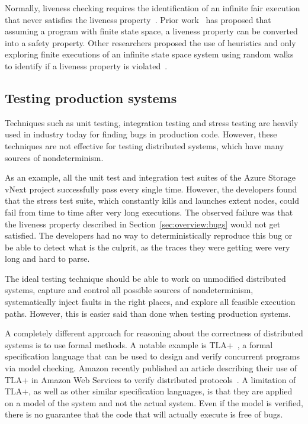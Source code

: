 Normally, liveness checking requires the identification of an infinite fair execution that never satisfies the liveness property~\cite{schuppan2004efficient, musuvathi2008fair}. Prior work~\cite{schuppan2004efficient} has proposed that assuming a program with finite state space, a liveness property can be converted into a safety property. Other researchers proposed the use of heuristics and only exploring finite executions of an infinite state space system using random walks to identify if a liveness property is violated~\cite{killian2007life}.


\subsection{Testing production systems}
\label{sec:overview:testing}

Techniques such as unit testing, integration testing and stress testing are heavily used in industry today for finding bugs in production code. However, these techniques are not effective for testing distributed systems, which have many sources of nondeterminism.

As an example, all the unit test and integration test suites of the Azure Storage vNext project successfully pass every single time. However, the developers found that the stress test suite, which constantly kills and launches extent nodes, could fail from time to time after very long executions. The observed failure was that the liveness property described in Section~\ref{sec:overview:bugs} would not get satisfied. The developers had no way to deterministically reproduce this bug or be able to detect what is the culprit, as the traces they were getting were very long and hard to parse.

The ideal testing technique should be able to work on unmodified distributed systems, capture and control all possible sources of nondeterminism, systematically inject faults in the right places, and explore all feasible execution paths. However, this is easier said than done when testing production systems.

A completely different approach for reasoning about the correctness of distributed systems is to use formal methods.  A notable example is TLA+~\cite{lamport1994temporal}, a formal specification language that can be used to design and verify concurrent programs via model checking. Amazon recently published an article describing their use of TLA+ in Amazon Web Services to verify distributed protocols~\cite{newcombe2015aws}. A limitation of TLA+, as well as other similar specification languages, is that they are applied on a model of the system and not the actual system. Even if the model is verified, there is no guarantee that the code that will actually execute is free of bugs.

